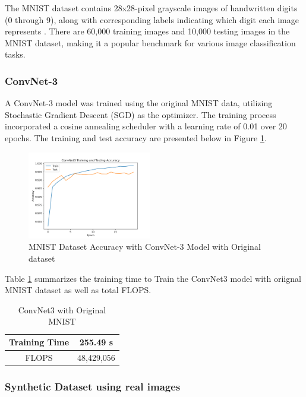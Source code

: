 \documentclass[conference, compsoc]{IEEEtran}
\begin{document}
	The MNIST dataset contains 28x28-pixel grayscale images of handwritten digits (0 through 9), along with corresponding labels indicating which digit each image represents \cite{deng2012mnist}. There are 60,000 training images and 10,000 testing images in the MNIST dataset, making it a popular benchmark for various image classification tasks.
	
	\subsubsection{ConvNet-3} \hfill
	
	A ConvNet-3 model was trained using the original MNIST data, utilizing Stochastic Gradient Descent (SGD) as the optimizer. The training process incorporated a cosine annealing scheduler with a learning rate of 0.01 over 20 epochs. The training and test accuracy are presented below in Figure \ref{fig:ConvNet3_training_testing_accuracy}.
	
	\begin{figure}[H]
		\centering
		\includegraphics[width=0.48\textwidth]{ConvNet3_training_testing_accuracy.png}
		\caption{MNIST Dataset Accuracy with ConvNet-3 Model with Original dataset}
		\label{fig:ConvNet3_training_testing_accuracy}
	\end{figure}
	
	Table \ref{tab:convet3_results} summarizes the training time to Train the ConvNet3 model with oriignal MNIST dataset as well as total FLOPS.    
	\begin{table}[H]
		\caption{ConvNet3 with Original MNIST}
		\centering
		\label{tab:convet3_results}
		\begin{tabular}{|c|c|}
			\hline
			Training Time & 255.49 s\\
			\hline
			FLOPS & 48,429,056 \\
			\hline
		\end{tabular}
	\end{table}
	
	\subsubsection{Synthetic Dataset using real images} \hfill
	
\end{document}
